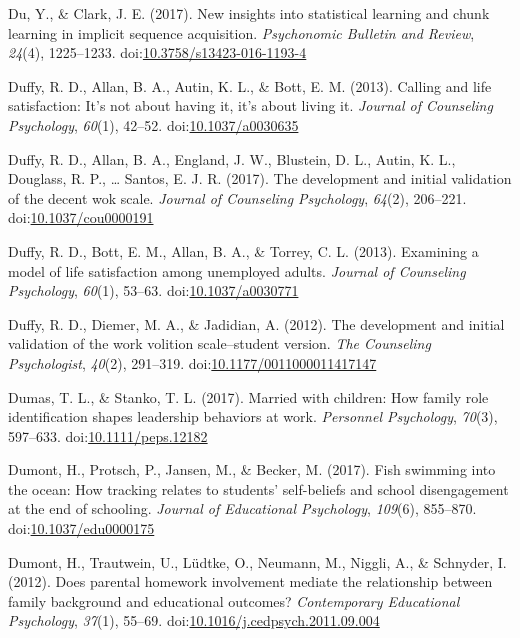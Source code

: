\documentclass[english,man]{apa6}
\theoremstyle{definition}
\theoremstyle{definition}
\theoremstyle{definition}
\theoremstyle{remark}
\begin{document}
\hypertarget{ref-Du2016}{}
Du, Y., \& Clark, J. E. (2017). New insights into statistical learning
and chunk learning in implicit sequence acquisition. \emph{Psychonomic
Bulletin and Review}, \emph{24}(4), 1225--1233.
doi:\href{https://doi.org/10.3758/s13423-016-1193-4}{10.3758/s13423-016-1193-4}

\hypertarget{ref-Duffy2013a}{}
Duffy, R. D., Allan, B. A., Autin, K. L., \& Bott, E. M. (2013). Calling
and life satisfaction: It's not about having it, it's about living it.
\emph{Journal of Counseling Psychology}, \emph{60}(1), 42--52.
doi:\href{https://doi.org/10.1037/a0030635}{10.1037/a0030635}

\hypertarget{ref-Duffy2017}{}
Duffy, R. D., Allan, B. A., England, J. W., Blustein, D. L., Autin, K.
L., Douglass, R. P., \ldots{} Santos, E. J. R. (2017). The development
and initial validation of the decent wok scale. \emph{Journal of
Counseling Psychology}, \emph{64}(2), 206--221.
doi:\href{https://doi.org/10.1037/cou0000191}{10.1037/cou0000191}

\hypertarget{ref-Duffy2013}{}
Duffy, R. D., Bott, E. M., Allan, B. A., \& Torrey, C. L. (2013).
Examining a model of life satisfaction among unemployed adults.
\emph{Journal of Counseling Psychology}, \emph{60}(1), 53--63.
doi:\href{https://doi.org/10.1037/a0030771}{10.1037/a0030771}

\hypertarget{ref-Duffy2012}{}
Duffy, R. D., Diemer, M. A., \& Jadidian, A. (2012). The development and
initial validation of the work volition scale--student version.
\emph{The Counseling Psychologist}, \emph{40}(2), 291--319.
doi:\href{https://doi.org/10.1177/0011000011417147}{10.1177/0011000011417147}

\hypertarget{ref-Dumas2017}{}
Dumas, T. L., \& Stanko, T. L. (2017). Married with children: How family
role identification shapes leadership behaviors at work. \emph{Personnel
Psychology}, \emph{70}(3), 597--633.
doi:\href{https://doi.org/10.1111/peps.12182}{10.1111/peps.12182}

\hypertarget{ref-Dumont2017}{}
Dumont, H., Protsch, P., Jansen, M., \& Becker, M. (2017). Fish swimming
into the ocean: How tracking relates to students' self-beliefs and
school disengagement at the end of schooling. \emph{Journal of
Educational Psychology}, \emph{109}(6), 855--870.
doi:\href{https://doi.org/10.1037/edu0000175}{10.1037/edu0000175}

\hypertarget{ref-Dumont2012}{}
Dumont, H., Trautwein, U., Lüdtke, O., Neumann, M., Niggli, A., \&
Schnyder, I. (2012). Does parental homework involvement mediate the
relationship between family background and educational outcomes?
\emph{Contemporary Educational Psychology}, \emph{37}(1), 55--69.
doi:\href{https://doi.org/10.1016/j.cedpsych.2011.09.004}{10.1016/j.cedpsych.2011.09.004}
\end{document}
